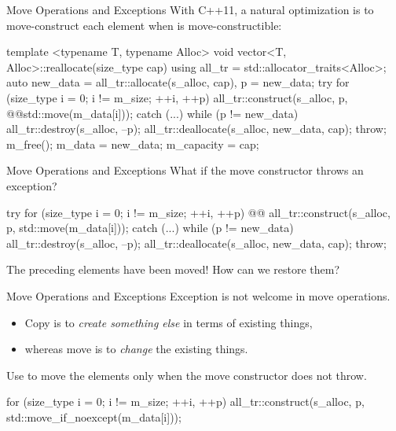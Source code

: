 \begin{frame}[fragile]{Move Operations and Exceptions}
  With C++11, a natural optimization is to move-construct each element when  is move-constructible:
  \begin{cpp}[\scriptsize]
template <typename T, typename Alloc>
void vector<T, Alloc>::reallocate(size_type cap) {
  using all_tr = std::allocator_traits<Alloc>;
  auto new_data = all_tr::allocate(s_alloc, cap), p = new_data;
  try {
    for (size_type i = 0; i != m_size; ++i, ++p)
      all_tr::construct(s_alloc, p, @\scriptsizepinkbox[10em]@std::move(m_data[i]));
  } catch (...) {
    while (p != new_data)
      all_tr::destroy(s_alloc, --p);
    all_tr::deallocate(s_alloc, new_data, cap);
    throw;
  }
  m_free();
  m_data = new_data;
  m_capacity = cap;
}
  \end{cpp}
\end{frame}

\begin{frame}[fragile]{Move Operations and Exceptions}
  What if the move constructor throws an exception?
  \begin{cpp}[\scriptsize]
  try {
    for (size_type i = 0; i != m_size; ++i, ++p)
@\scriptsizepinkbox[0.9\textwidth]\quad\danger @  all_tr::construct(s_alloc, p, std::move(m_data[i]));
  } catch (...) {
    while (p != new_data)
      all_tr::destroy(s_alloc, --p);
    all_tr::deallocate(s_alloc, new_data, cap);
    throw;
  }
  \end{cpp}
  \pause
  The preceding elements have been moved! How can we restore them?
\end{frame}

\begin{frame}[fragile]{Move Operations and Exceptions}
  Exception is not welcome in move operations.
  \begin{itemize}
    \item Copy is to \textit{create something else} in terms of existing things,
    \item whereas move is to \textit{change} the existing things.
  \end{itemize}
  \pause
  Use  to move the elements only when the move constructor does not throw.
  \begin{cpp}[\small]
for (size_type i = 0; i != m_size; ++i, ++p)
  all_tr::construct(s_alloc, p,
                    std::move_if_noexcept(m_data[i]));
  \end{cpp}
\end{frame}

